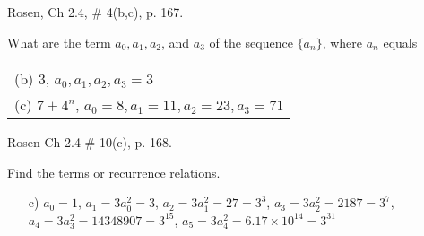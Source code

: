\documentclass[11pt]{exam}
\newcommand{\N}{\mathbb{N}}
\begin{document}
\begin{questions}
\begin{solution}
\end{solution}



\question  Rosen, Ch 2.4, \# 4(b,c), p. 167.
\begin{solution}
What are the term $a_0, a_1, a_2$, and $a_3$ of the sequence $\{a_n\}$, where $a_n$ equals \\

\begin{tabular}{l}
  (b) 3, $a_0, a_1, a_2, a_3 = 3$  \\
  (c) $7 + 4^n$, $a_0 = 8, a_1 = 11, a_2 = 23, a_3 = 71$ \\
\end{tabular}
\end{solution}

\question Rosen Ch 2.4 \# 10(c), p. 168.
\begin{solution}
Find the terms or recurrence relations.
\begin{itemize}
  \setlength{\itemsep}{1pt}
  \setlength{\parskip}{0pt}
  \setlength{\parsep}{0pt}
    \item[c)] $a_0 = 1$, $a_1 = 3a_0^2 = 3$, $a_2 = 3a_1^2 = 27 = 3^3$, $a_3 = 3a_2^2 = 2187 = 3^7$, $a_4 = 3a_3^2 = 14348907 = 3^{15}$, $a_5 = 3a_4^2 = 6.17 \times 10^{14} = 3^{31}$
\end{itemize}
\end{solution}


\end{questions}
\end{document}
